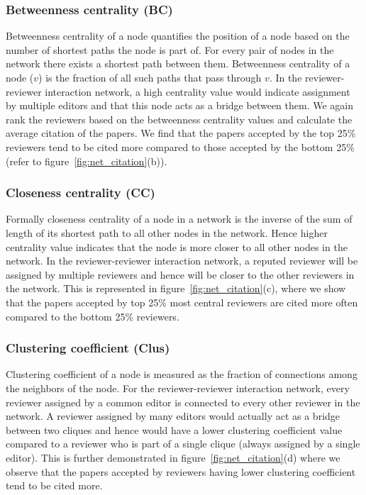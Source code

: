 \subsubsection{Betweenness centrality (BC)}

Betweenness centrality of a node quantifies the position of a node based on the number of shortest paths the node is part of. For every  pair of nodes in the network there exists a shortest path between them. Betweenness centrality of a node ($v$) is the fraction of all such paths that pass through $v$. In the reviewer-reviewer interaction network, a high  centrality value would indicate assignment by multiple editors and that this node acts as a bridge between them. We again rank the reviewers based on the betweenness centrality values and calculate the average citation of the papers. We find that the papers accepted by the top 25\% reviewers tend to be cited more compared to those accepted by the bottom 25\% (refer to figure~\ref{fig:net_citation}(b)). 

\subsubsection{Closeness centrality (CC)}

Formally closeness centrality of a node in a network is the inverse of the sum of length of its shortest path to all other nodes in the network. Hence higher centrality value indicates that the node is more closer to all other nodes in the network. In the reviewer-reviewer interaction network, a reputed reviewer will be assigned by multiple reviewers and hence will be closer to the other reviewers in the network. This is represented in figure~\ref{fig:net_citation}(c), where we show that the papers accepted by top 25\% most central reviewers 
are cited more often compared to the bottom 25\% reviewers. 

\subsubsection{Clustering coefficient (Clus)}

Clustering coefficient of a node is measured as the fraction of connections among the neighbors of the node. For the reviewer-reviewer interaction network, every reviewer assigned by a common editor is connected to every other reviewer in the network. A reviewer assigned by many editors would actually act as a bridge between two cliques and hence would have a lower clustering coefficient value compared to a reviewer who is part of a single clique (always assigned by a single editor). This is further demonstrated in  figure~\ref{fig:net_citation}(d) where we observe that the papers accepted by reviewers having lower clustering coefficient tend to be cited more.

